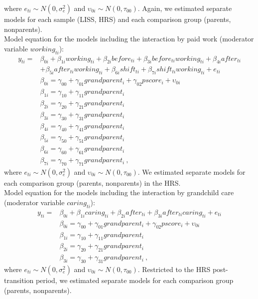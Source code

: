 \documentclass[
  english,
  man,floatsintext]{apa7}
\begin{document}
where \(e_{ti} \sim N(0, \sigma_e^2)\) and \(\upsilon_{0i} \sim N(0, \tau_{00})\). Again, we estimated separate models for each sample (LISS, HRS) and each comparison group (parents, nonparents).\\
Model equation for the models including the interaction by paid work (moderator variable \(working_{ti}\)):
\begin{equation}
\begin{split}
y_{ti} =& \beta_{0i} + \beta_{1i}working_{ti} + \beta_{2i}before_{ti} + \beta_{3i}before_{ti}working_{ti} + \beta_{4i}after_{ti} \\
 & + \beta_{5i}after_{ti}working_{ti} + \beta_{6i}shift_{ti} + \beta_{7i}shift_{ti}working_{ti} + e_{ti} \\
 & \beta_{0i} = \gamma_{00} + \gamma_{01}grandparent_i + \gamma_{02}pscore_i + \upsilon_{0i} \\
 & \beta_{1i} = \gamma_{10} + \gamma_{11}grandparent_i \\
 & \beta_{2i} = \gamma_{20} + \gamma_{21}grandparent_i \\
 & \beta_{3i} = \gamma_{30} + \gamma_{31}grandparent_i \\
 & \beta_{4i} = \gamma_{40} + \gamma_{41}grandparent_i \\
 & \beta_{5i} = \gamma_{50} + \gamma_{51}grandparent_i \\
 & \beta_{6i} = \gamma_{60} + \gamma_{61}grandparent_i \\
 & \beta_{7i} = \gamma_{70} + \gamma_{71}grandparent_i\ ,
\end{split}
  \label{eq:mlm3}
\end{equation}
where \(e_{ti} \sim N(0, \sigma_e^2)\) and \(\upsilon_{0i} \sim N(0, \tau_{00})\). We estimated separate models for each comparison group (parents, nonparents) in the HRS.\\
Model equation for the models including the interaction by grandchild care (moderator variable \(caring_{ti}\)):
\begin{equation}
\begin{split}
y_{ti} =& \beta_{0i} + \beta_{1i}caring_{ti} + \beta_{2i}after_{ti} + \beta_{3i}after_{ti}caring_{ti} + e_{ti} \\
 & \beta_{0i} = \gamma_{00} + \gamma_{01}grandparent_i + \gamma_{02}pscore_i + \upsilon_{0i} \\
 & \beta_{1i} = \gamma_{10} + \gamma_{11}grandparent_i \\
 & \beta_{2i} = \gamma_{20} + \gamma_{21}grandparent_i \\
 & \beta_{3i} = \gamma_{30} + \gamma_{31}grandparent_i\ ,
\end{split}
  \label{eq:mlm4}
\end{equation}
where \(e_{ti} \sim N(0, \sigma_e^2)\) and \(\upsilon_{0i} \sim N(0, \tau_{00})\). Restricted to the HRS post-transition period, we estimated separate models for each comparison group (parents, nonparents).
\end{document}
